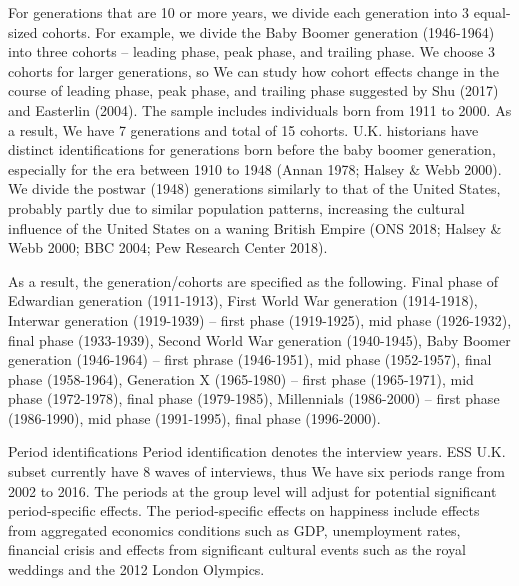 For generations that are 10 or more years, we divide each generation into 3 equal-sized cohorts. For example, we divide the Baby Boomer generation (1946-1964) into three cohorts – leading phase, peak phase, and trailing phase. We choose 3 cohorts for larger generations, so We can study how cohort effects change in the course of leading phase, peak phase, and trailing phase suggested by Shu (2017) and Easterlin (2004). The sample includes individuals born from 1911 to 2000. As a result, We have 7 generations and total of 15 cohorts. U.K. historians have distinct identifications for generations born before the baby boomer generation, especially for the era between 1910 to 1948 (Annan 1978; Halsey & Webb 2000). We divide the postwar (1948) generations similarly to that of the United States, probably partly due to similar population patterns, increasing the cultural influence of the United States on a waning British Empire (ONS 2018; Halsey & Webb 2000; BBC 2004; Pew Research Center 2018). 

As a result, the generation/cohorts are specified as the following. Final phase of Edwardian generation (1911-1913), First World War generation (1914-1918), Interwar generation (1919-1939) – first phase (1919-1925), mid phase (1926-1932), final phase (1933-1939), Second World War generation (1940-1945),  Baby Boomer generation (1946-1964) – first phrase (1946-1951), mid phase (1952-1957), final phase (1958-1964), Generation X (1965-1980) – first phase (1965-1971), mid phase (1972-1978), final phase (1979-1985), Millennials (1986-2000) – first phase (1986-1990), mid phase (1991-1995), final phase (1996-2000).

Period identifications
Period identification denotes the interview years. ESS U.K. subset currently have 8 waves of interviews, thus We have six periods range from 2002 to 2016. The periods at the group level will adjust for potential significant period-specific effects. The period-specific effects on happiness include effects from aggregated economics conditions such as GDP, unemployment rates, financial crisis and effects from significant cultural events such as the royal weddings and the 2012 London Olympics.

